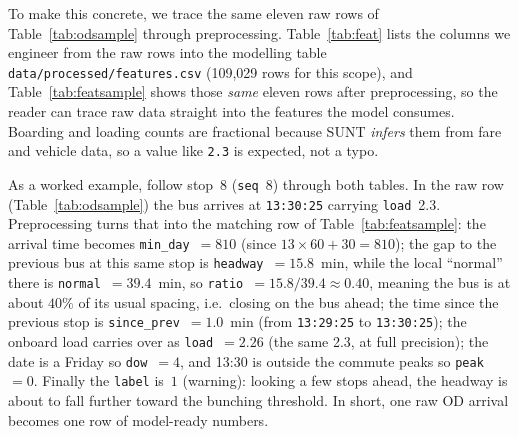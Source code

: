 \documentclass[final,5p,times,twocolumn,authoryear]{elsarticle}
\begin{document}
To make this concrete, we trace the same eleven raw rows of Table~\ref{tab:odsample} through
preprocessing. Table~\ref{tab:feat} lists the columns we engineer from the raw rows into the
modelling table \texttt{data/processed/features.csv} (109{,}029 rows for this scope), and
Table~\ref{tab:featsample} shows those \emph{same} eleven rows after preprocessing, so the reader can
trace raw data straight into the features the model consumes. Boarding and loading counts are
fractional because SUNT \emph{infers} them from fare and vehicle data, so a value like \texttt{2.3}
is expected, not a typo.

As a worked example, follow stop~8 (\texttt{seq}~8) through both tables. In the raw row
(Table~\ref{tab:odsample}) the bus arrives at \texttt{13:30:25} carrying \texttt{load}~2.3.
Preprocessing turns that into the matching row of Table~\ref{tab:featsample}: the arrival time
becomes \texttt{min\_day}~$=810$ (since $13\times60+30=810$); the gap to the previous bus at this
same stop is \texttt{headway}~$=15.8$~min, while the local ``normal'' there is
\texttt{normal}~$=39.4$~min, so \texttt{ratio}~$=15.8/39.4\approx0.40$, meaning the bus is at about
$40\%$ of its usual spacing, i.e.\ closing on the bus ahead; the time since the previous stop is
\texttt{since\_prev}~$=1.0$~min (from \texttt{13:29:25} to \texttt{13:30:25}); the onboard load
carries over as \texttt{load}~$=2.26$ (the same 2.3, at full precision); the date is a Friday so
\texttt{dow}~$=4$, and 13:30 is outside the commute peaks so \texttt{peak}~$=0$. Finally the
\texttt{label} is~$1$ (warning): looking a few stops ahead, the headway is about to fall further
toward the bunching threshold. In short, one raw OD arrival becomes one row of model-ready numbers.
\end{document}
